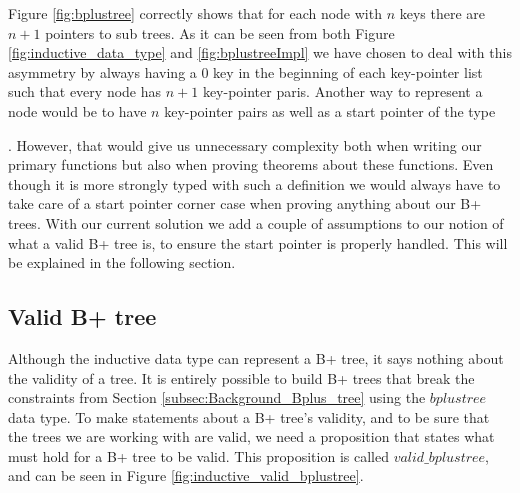 Figure \ref{fig:bplustree} correctly shows that for each node with $n$ keys there are $n+1$ pointers to sub trees. As it can be seen from both Figure \ref{fig:inductive_data_type} and \ref{fig:bplustreeImpl} we have chosen to deal with this asymmetry by always having a $0$ key in the beginning of each key-pointer list such that every node has $n+1$ key-pointer paris. Another way to represent a node would be to have $n$ key-pointer pairs as well as a start pointer of the type \begin{coqdoccode}  \end{coqdoccode}. However, that would give us unnecessary complexity both when writing our primary functions but also when proving theorems about these functions. Even though it is more strongly typed with such a definition we would always have to take care of a start pointer corner case when proving anything about our B+ trees. With our current solution we add a couple of assumptions to our notion of what a valid B+ tree is, to ensure the start pointer is properly handled. This will be explained in the following section. 


\subsection{Valid B+ tree}
\label{subsec:Valid_bplustree}
Although the inductive data type can represent a B+ tree, it says nothing about the validity of a tree. It is entirely possible to build B+ trees that break the constraints from Section \ref{subsec:Background_Bplus_tree} using the $bplustree$ data type. To make statements about a B+ tree's validity, and to be sure that the trees we are working with are valid, we need a proposition that states what must hold for a B+ tree to be valid. This proposition is called $valid\_bplustree$, and can be seen in Figure \ref{fig:inductive_valid_bplustree}.

